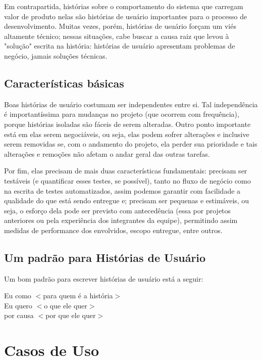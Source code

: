 Em contrapartida, histórias sobre o comportamento do sistema que carregam valor de produto nelas são histórias de usuário importantes para o processo de desenvolvimento. Muitas vezes, porém, histórias de usuário forçam um viés altamente técnico; nessas situações, cabe buscar a causa raiz que levou à "solução" escrita na história: histórias de usuário apresentam problemas de negócio, jamais soluções técnicas.

\subsection{Características básicas}

Boas histórias de usuário costumam ser independentes entre si. Tal independência é importantíssima para mudanças no projeto (que ocorrem com frequência), porque histórias isoladas são fáceis de serem alteradas. Outro ponto importante está em elas serem negociáveis, ou seja, elas podem sofrer alterações e inclusive serem removidas se, com o andamento do projeto, ela perder sua prioridade e tais alterações e remoções não afetam o andar geral das outras tarefas.

Por fim, elas precisam de mais duas características fundamentais: precisam ser testáveis (e quantificar esses testes, se possível), tanto no fluxo de negócio como na escrita de testes automatizados, assim podemos garantir com facilidade a qualidade do que está sendo entregue e; precisam ser pequenas e estimáveis, ou seja, o esforço dela pode ser previsto com antecedência (essa por projetos anteriores ou pela experiência dos integrantes da equipe), permitindo assim medidas de performance dos envolvidos, escopo entregue, entre outros.

\subsection{Um padrão para Histórias de Usuário}

Um bom padrão para escrever histórias de usuário está a seguir\cite{jonathanrasmusson}:

\begin{citacaoLonga}
Eu como $<$para quem é a história$>$
\\
Eu quero $<$o que ele quer$>$
\\
por causa $<$por que ele quer$>$
\end{citacaoLonga}

\section{Casos de Uso}


